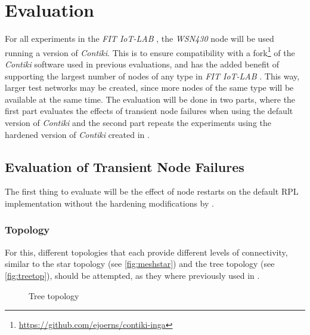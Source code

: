\documentclass[
  a4paper,
  11pt,
  style=screen,
  extramargin,
  bcor=10mm,
  rgb,
  hyperrefdark,
  abstract=off,
  lnum,
]{tubsartcl}
\newcommand{\fitlab}{\emph{FIT IoT-LAB} }
\begin{document}
\section{Evaluation} %

For all experiments in the \fitlab, the \emph{WSN430} node will be used running a version of \emph{Contiki}.
This is to ensure compatibility with a fork\footnote{\url{https://github.com/ejoerns/contiki-inga}} of the \emph{Contiki} software used in previous evaluations, and has the added benefit of supporting the largest number of nodes of any type in \fitlab.
This way, larger test networks may be created, since more nodes of the same type will be available at the same time.
The evaluation will be done in two parts, where the first part evaluates the effects of transient node failures when using the default version of \emph{Contiki} and the second part repeats the experiments using the hardened version of \emph{Contiki} created in \cite{mueller2017}.

\subsection{Evaluation of Transient Node Failures}

The first thing to evaluate will be the effect of node restarts on the default \ac{RPL} implementation without the hardening modifications by \cite{mueller2017}. 

\subsubsection{Topology}

For this, different topologies that each provide different levels of connectivity, similar to the star topology (see \autoref{fig:meshstar}) and the tree topology (see \autoref{fig:treetop}), should be attempted, as they where previously used in \cite{mueller2017}.

\begin{figure}[h]
  \centering
  \caption{Tree topology}
  \label{fig:treetop}
\end{figure}
\end{document}
